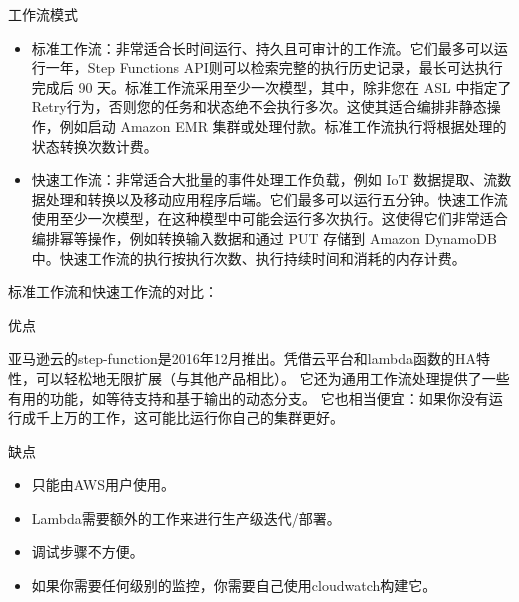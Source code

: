 工作流模式
\begin{itemize}
    \item 标准工作流：非常适合长时间运行、持久且可审计的工作流。它们最多可以运行一年，Step Functions API则可以检索完整的执行历史记录，最长可达执行完成后 90 天。标准工作流采用至少一次模型，其中，除非您在 ASL 中指定了Retry行为，否则您的任务和状态绝不会执行多次。这使其适合编排非静态操作，例如启动 Amazon EMR 集群或处理付款。标准工作流执行将根据处理的状态转换次数计费。
    \item 快速工作流：非常适合大批量的事件处理工作负载，例如 IoT 数据提取、流数据处理和转换以及移动应用程序后端。它们最多可以运行五分钟。快速工作流使用至少一次模型，在这种模型中可能会运行多次执行。这使得它们非常适合编排幂等操作，例如转换输入数据和通过 PUT 存储到 Amazon DynamoDB 中。快速工作流的执行按执行次数、执行持续时间和消耗的内存计费。
\end{itemize}


标准工作流和快速工作流的对比：

优点

亚马逊云的step-function是2016年12月推出。凭借云平台和lambda函数的HA特性，可以轻松地无限扩展（与其他产品相比）。
它还为通用工作流处理提供了一些有用的功能，如等待支持和基于输出的动态分支。
它也相当便宜：如果你没有运行成千上万的工作，这可能比运行你自己的集群更好。

缺点

\begin{itemize}
    \item 只能由AWS用户使用。
    \item Lambda需要额外的工作来进行生产级迭代/部署。
    \item 调试步骤不方便。
    \item 如果你需要任何级别的监控，你需要自己使用cloudwatch构建它。
\end{itemize}


